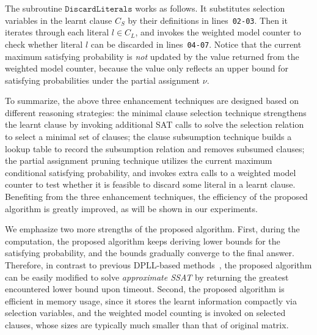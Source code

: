     The subroutine $\mathtt{DiscardLiterals}$ works as follows.
    It substitutes selection variables in the learnt clause $C_S$ by their definitions in lines~\texttt{02-03}.
    Then it iterates through each literal $l \in C_L$, and invokes the weighted model counter to check whether literal $l$ can be discarded in lines~\texttt{04-07}.
    Notice that the current maximum satisfying probability is \emph{not} updated by the value returned from the weighted model counter, because the value only reflects an upper bound for satisfying probabilities under the partial assignment $\nu$.
\fi

\iffalse
    \begin{example}\label{ex:partial}
        Continue Example~\ref{ex:basic}. As discussed above, the learnt clause $(e_1 \vee e_2)$ deduced from the assignment $\tau_1=\neg e_1 \neg e_2 \neg e_3$ is strengthen to $(e_1)$ by the partial assignment pruning technique, and thus prevents a fruitless trail of the assignment $\tau_2=\neg e_1 e_2 \neg e_3$.
    \end{example}
\fi

To summarize, the above three enhancement techniques are designed based on different reasoning strategies:
the minimal clause selection technique strengthens the learnt clause by invoking additional SAT calls to solve the selection relation to select a minimal set of clauses;
the clause subsumption technique builds a lookup table to record the subsumption relation and removes subsumed clauses;
the partial assignment pruning technique utilizes the current maximum conditional satisfying probability,
and invokes extra calls to a weighted model counter to test whether it is feasible to discard some literal in a learnt clause.
Benefiting from the three enhancement techniques,
the efficiency of the proposed algorithm is greatly improved,
as will be shown in our experiments.

We emphasize two more strengths of the proposed algorithm.
First, during the computation,
the proposed algorithm keeps deriving lower bounds for the satisfying probability,
and the bounds gradually converge to the final answer.
Therefore, in contrast to previous DPLL-based methods~\cite{Majercik1998,Majercik2003,Majercik2005},
the proposed algorithm can be easily modified to solve \textit{approximate SSAT} by returning the greatest encountered lower bound upon timeout.
Second, the proposed algorithm is efficient in memory usage,
since it stores the learnt information compactly via selection variables,
and the weighted model counting is invoked on selected clauses,
whose sizes are typically much smaller than that of original matrix.


